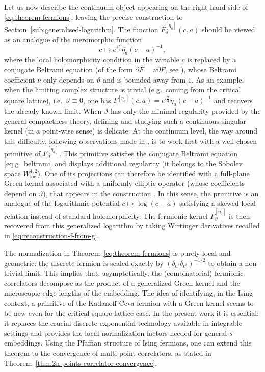 \documentclass[reqno]{amsart}
\numberwithin{equation}{section}
\theoremstyle{definition}
\theoremstyle{remark}
\begin{document}
Let us now describe the continuum object appearing on the right-hand side of \eqref{eq:theorem-fermions}, leaving the precise construction to  Section~\ref{sub:generalised-logarithm}. The function $F^{[\eta_a]}_{\vartheta}(c,a)$ should be viewed as an analogue of the meromorphic function
\[
c \longmapsto e^{i\frac{\pi}{4}} \overline{\eta_a}(c-a)^{-1},
\]
where the local holomorphicity condition in the variable $c$ is replaced by a conjugate Beltrami equation (of the form $\partial F = \nu \partial \overline{F}$, see \cite[Section 2.7]{Che20}), whose Beltrami coefficient $\nu$ only depends on $\vartheta$ and is bounded away from $1$. As an example, when the limiting complex structure is trivial (e.g.\ coming from the critical square lattice), i.e.\ $\vartheta \equiv 0$, one has $F^{[\eta_a]}(c,a)=e^{i\frac{\pi}{4}}\overline{\eta_a}(c-a)^{-1}$ and  recovers the already known limit. When $\vartheta$ has only the minimal regularity provided by the general compactness theory, defining and studying such a continuous singular kernel (in a point-wise sense) is delicate. At the continuum level, the way around this difficulty, following observations made in \cite{Che20,MahPHD}, is to work first with a well-chosen primitive of $F^{[\eta_a]}_{\vartheta}$. This primitive satisfies the conjugate Beltrami equation \eqref{eq:g_beltrami} and displays additional regularity (it belongs to the Sobolev space $W^{1,2}_{\textrm{loc}}$). One of its projections can therefore be identified with a full-plane Green kernel associated with a uniformly elliptic operator (whose coefficients depend on $\vartheta$), that appears in the construction \cite[Theorem 6.7]{TaylorKimBrown}. In this sense, the primitive is an analogue of the logarithmic potential $c \longmapsto \log (c-a)$ satisfying a skewed local relation instead of standard holomorphicity. The fermionic kernel $F^{[\eta_a]}_{\vartheta}$ is then recovered from this generalized logarithm by taking Wirtinger derivatives recalled in \eqref{eq:reconstruction-f-from-g}. 

The normalization in Theorem~\ref{eq:theorem-fermions} is purely local and geometric: the discrete fermion is scaled exactly by $(\delta_{a^\delta}\delta_{c^\delta})^{-1/2}$ to obtain a non-trivial limit. This implies that, asymptotically, the (combinatorial) fermionic correlators decompose as the product of a generalized Green kernel and the microscopic edge lengths of the embedding. The idea of identifying, in the Ising context, a primitive of the Kadanoff-Ceva fermion with a Green kernel seems to be new even for the critical square lattice case. In the present work it is essential: it replaces the crucial discrete-exponential technology available in integrable settings \cite{BdT2010,BdT2011,BdTR1,BdTR2} and provides the local normalization factors needed for general $s$-embeddings.
Using the Pfaffian structure of Ising fermions, one can extend this theorem to the convergence of multi-point correlators, as stated in Theorem~\ref{thm:2n-points-correlator-convergence}. 
\end{document}
